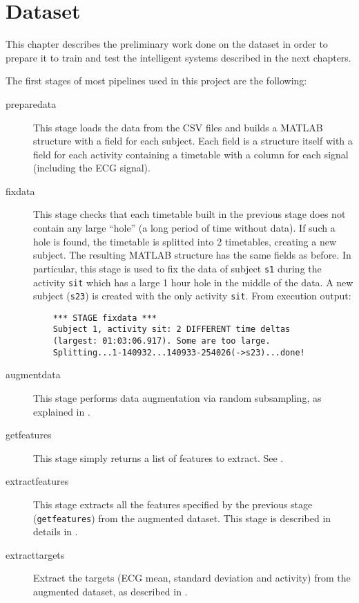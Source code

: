 \chapter{Dataset}\label{ch:dataset}

This chapter describes the preliminary work done on the dataset in order to
prepare it to train and test the intelligent systems described in the next
chapters.

The first stages of most pipelines used in this project are the following:
\begin{description}
\item[preparedata] This stage loads the data from the CSV files and builds a
	MATLAB structure with a field for each subject. Each field is a
	structure itself with a field for each activity containing a timetable
	with a column for each signal (including the ECG signal).
\item[fixdata] This stage checks that each timetable built in the previous
	stage does not contain any large ``hole'' (a long period of time
	without data). If such a hole is found, the timetable is splitted into
	2 timetables, creating a new subject. The resulting MATLAB structure
	has the same fields as before. In particular, this stage is used to fix
	the data of subject \texttt{s1} during the activity \texttt{sit} which
	has a large 1 hour hole in the middle of the data. A new subject
	(\texttt{s23}) is created with the only activity \texttt{sit}. From
	execution output:
	\begin{verbatim}
	*** STAGE fixdata ***
	Subject 1, activity sit: 2 DIFFERENT time deltas
	(largest: 01:03:06.917). Some are too large.
	Splitting...1-140932...140933-254026(->s23)...done!
	\end{verbatim}
\item[augmentdata] This stage performs data augmentation via random
	subsampling, as explained in .
\item[getfeatures] This stage simply returns a list of features to extract. See
	.
\item[extractfeatures] This stage extracts all the features specified by the
	previous stage (\texttt{getfeatures}) from the augmented dataset. This
	stage is described in details in .
\item[extracttargets] Extract the targets (ECG mean, standard deviation and
	activity) from the augmented dataset, as described in
	.
\end{description}




